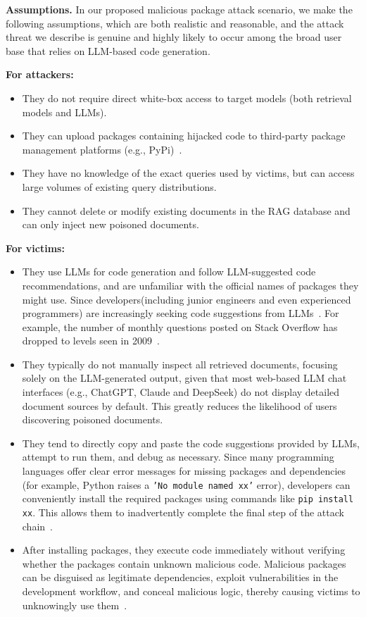 \textbf{Assumptions.} In our proposed malicious package attack scenario, we make the following assumptions, which are both realistic and reasonable, and the attack threat we describe is genuine and highly likely to occur among the broad user base that relies on LLM-based code generation.

\textbf{For attackers:}
\begin{itemize}
    \item They do not require direct white-box access to target models (both retrieval models and LLMs).
    \item They can upload packages containing hijacked code to third-party package management platforms (e.g., PyPi)~\citep{malicious_package_collection}.
    \item They have no knowledge of the exact queries used by victims, but can access large volumes of existing query distributions.
    \item They cannot delete or modify existing documents in the RAG database and can only inject new poisoned documents.
\end{itemize}

\textbf{For victims:}
\begin{itemize}
    \item They use LLMs for code generation and follow LLM-suggested code recommendations, and are unfamiliar with the official names of packages they might use. Since developers(including junior engineers and even experienced programmers) are increasingly seeking code suggestions from LLMs~\citep{code_gen_survey}. For example, the number of monthly questions posted on Stack Overflow has dropped to levels seen in 2009~\citep{stackoverflow}.
    \item They typically do not manually inspect all retrieved documents, focusing solely on the LLM-generated output, given that most web-based LLM chat interfaces (e.g., ChatGPT, Claude and DeepSeek) do not display detailed document sources by default. This greatly reduces the likelihood of users discovering poisoned documents.
    \item They tend to directly copy and paste the code suggestions provided by LLMs, attempt to run them, and debug as necessary. Since many programming languages offer clear error messages for missing packages and dependencies (for example, Python raises a \texttt{'No module named xx'} error), developers can conveniently install the required packages using commands like \texttt{pip install xx}. This allows them to inadvertently complete the final step of the attack chain~\citep{python_malicious_package}.
    \item After installing packages, they execute code immediately without verifying whether the packages contain unknown malicious code. Malicious packages can be disguised as legitimate dependencies, exploit vulnerabilities in the development workflow, and conceal malicious logic, thereby causing victims to unknowingly use them~\citep{software_supply_chain_sec_1,software_supply_chain_sec_2,software_supply_chain_sec_3}.
\end{itemize}





